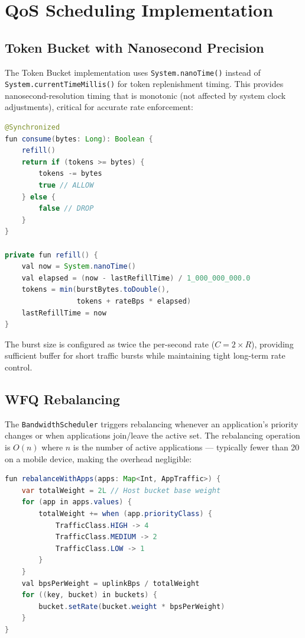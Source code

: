 
\section{QoS Scheduling Implementation}
\label{sec:qos_impl}

\subsection{Token Bucket with Nanosecond Precision}

The Token Bucket implementation uses \texttt{System.nanoTime()} instead of \texttt{System.currentTimeMillis()} for token replenishment timing. This provides nanosecond-resolution timing that is monotonic (not affected by system clock adjustments), critical for accurate rate enforcement:

\begin{lstlisting}[language=Java, caption={Token Bucket consume operation}]
@Synchronized
fun consume(bytes: Long): Boolean {
    refill()
    return if (tokens >= bytes) {
        tokens -= bytes
        true // ALLOW
    } else {
        false // DROP
    }
}

private fun refill() {
    val now = System.nanoTime()
    val elapsed = (now - lastRefillTime) / 1_000_000_000.0
    tokens = min(burstBytes.toDouble(),
                 tokens + rateBps * elapsed)
    lastRefillTime = now
}
\end{lstlisting}

The burst size is configured as twice the per-second rate ($C = 2 \times R$), providing sufficient buffer for short traffic bursts while maintaining tight long-term rate control.

\subsection{WFQ Rebalancing}

The \texttt{BandwidthScheduler} triggers rebalancing whenever an application's priority changes or when applications join/leave the active set. The rebalancing operation is $O(n)$ where $n$ is the number of active applications --- typically fewer than 20 on a mobile device, making the overhead negligible:

\begin{lstlisting}[language=Java, caption={WFQ rebalancing algorithm}]
fun rebalanceWithApps(apps: Map<Int, AppTraffic>) {
    var totalWeight = 2L // Host bucket base weight
    for (app in apps.values) {
        totalWeight += when (app.priorityClass) {
            TrafficClass.HIGH -> 4
            TrafficClass.MEDIUM -> 2
            TrafficClass.LOW -> 1
        }
    }
    val bpsPerWeight = uplinkBps / totalWeight
    for ((key, bucket) in buckets) {
        bucket.setRate(bucket.weight * bpsPerWeight)
    }
}
\end{lstlisting}

